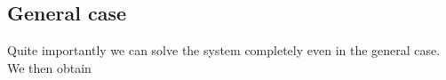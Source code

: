 \subsection{General case}

Quite importantly we can solve the system completely even in the general case. We then obtain 